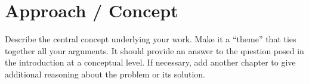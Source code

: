 \chapter{Approach / Concept}
\label{c:approach}

Describe the central concept underlying your work. Make it a ``theme'' that ties together all your arguments. It should provide an answer to the question posed in the introduction at a conceptual level. If necessary, add another chapter to give additional reasoning about the problem or its solution.
